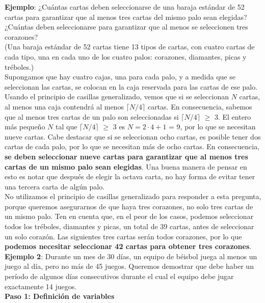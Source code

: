 \documentclass{article}
\begin{document}
\textbf{Ejemplo}: ¿Cuántas cartas deben seleccionarse de una baraja estándar de 52 cartas para garantizar que al menos tres cartas del mismo palo sean elegidas? ¿Cuántas deben seleccionarse para garantizar que al menos se seleccionen tres corazones? \\

(Una baraja estándar de 52 cartas tiene 13 tipos de cartas, con cuatro cartas de cada tipo, una en cada uno de los cuatro palos: corazones, diamantes, picas y tréboles.) \\

Supongamos que hay cuatro cajas, una para cada palo, y a medida que se seleccionan las cartas, se colocan en la caja reservada para las cartas de ese palo. Usando el principio de casillas generalizado, vemos que si se seleccionan $N$ cartas, al menos una caja contendrá al menos $\lceil N/4 \rceil$ cartas. En consecuencia, sabemos que al menos tres cartas de un palo son seleccionadas si $\lceil N/4 \rceil$ $\geq$ 3. El entero más pequeño $N$ tal que $\lceil N/4 \rceil$ $\geq$ 3 es $N = 2 \cdot 4 + 1$ = 9, por lo que se necesitan nueve cartas. Cabe destacar que si se seleccionan ocho cartas, es posible tener dos cartas de cada palo, por lo que se necesitan más de ocho cartas. En consecuencia, \textbf{se deben seleccionar nueve cartas para garantizar que al menos tres cartas de un mismo palo sean elegidas}. Una buena manera de pensar en esto es notar que después de elegir la octava carta, no hay forma de evitar tener una tercera carta de algún palo. \\

No utilizamos el principio de casillas generalizado para responder a esta pregunta, porque queremos asegurarnos de que haya tres corazones, no solo tres cartas de un mismo palo. Ten en cuenta que, en el peor de los casos, podemos seleccionar todos los tréboles, diamantes y picas, un total de 39 cartas, antes de seleccionar un solo corazón. Las siguientes tres cartas serán todos corazones, por lo que \textbf{podemos necesitar seleccionar 42 cartas para obtener tres corazones}. \\

\textbf{Ejemplo 2}: Durante un mes de 30 días, un equipo de béisbol juega al menos un juego al día, pero no más de 45 juegos. Queremos demostrar que debe haber un período de algunos días consecutivos durante el cual el equipo debe jugar exactamente 14 juegos.  \\

\textbf{Paso 1: Definición de variables}
\end{document}
